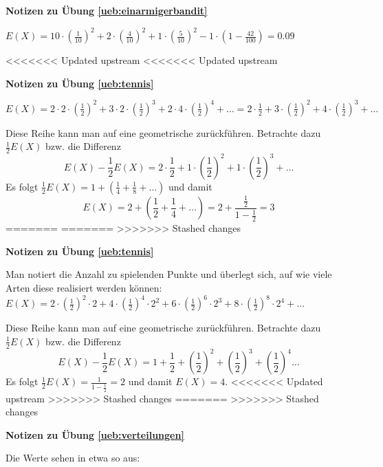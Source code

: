 \documentclass[%
<<<<<<< Updated upstream
<<<<<<< Updated upstream
11pt,%
twoside,%
titlepage,%
german,%
=======
=======
>>>>>>> Stashed changes
11pt,%
twoside,%
titlepage,%
swissgerman,%
<<<<<<< Updated upstream
>>>>>>> Stashed changes
=======
>>>>>>> Stashed changes
headsepline%
]{scrartcl}
\newcommand{\faReturnGray}{\textcolor{gray}{\faMailReply}} %
\theoremstyle{definition}
\theoremstyle{plain}
\newcommand{\concatueb}[1]{ueb:#1}%
\newcommand{\concatlsg}[1]{lsg:#1}%
\newenvironment{lsg}[1]{%
    \par\noindent\textbf{Notizen zu Übung \ref{\concatueb{#1}}}\label{\concatlsg{#1}}
    \hfill\hyperref[\concatueb{#1}]{\faReturnGray}\par %
}{%
    \par%
}
\newcommand{\concatueb}[1]{ueb:#1}%
\newcommand{\concatlsg}[1]{lsg:#1}%
\newenvironment{lsg}[1]{%
    \par\noindent\textbf{Notizen zu Übung \ref{\concatueb{#1}}.}%
    \label{\concatlsg{#1}}
}{%
    \par%
}
\begin{document}
\begin{lsg}{einarmigerbandit}
    $E(X)=10\cdot(\frac{1}{10})^2+2\cdot(\frac{4}{10})^2+1\cdot(\frac{5}{10})^2-1\cdot(1-\frac{42}{100})=0.09$
\end{lsg}
<<<<<<< Updated upstream
<<<<<<< Updated upstream
\begin{lsg}{tennis}
    $E(X)=2\cdot2\cdot(\frac{1}{2})^2+3\cdot2\cdot(\frac{1}{2})^3+2\cdot4\cdot(\frac{1}{2})^4+\dots=2\cdot\frac{1}{2}+3\cdot(\frac{1}{2})^2+4\cdot(\frac{1}{2})^3+\dots$

    Diese Reihe kann man auf eine geometrische zurückführen. Betrachte dazu $\frac{1}{2}E(X)$ bzw. die Differenz
    $$E(X)-\frac{1}{2}E(X)=2\cdot\frac{1}{2}+1\cdot(\frac{1}{2})^2+1\cdot(\frac{1}{2})^3+\dots$$
    Es folgt $\frac{1}{2}E(X)=1+(\frac{1}{4}+\frac{1}{8}+\dots)$ und damit
    $$E(X)=2+(\frac{1}{2}+\frac{1}{4}+\dots)=2+\frac{\frac{1}{2}}{1-\frac{1}{2}}=3$$
=======
=======
>>>>>>> Stashed changes

\begin{lsg}{tennis}
    Man notiert die Anzahl zu spielenden Punkte und überlegt sich, auf wie viele Arten diese realisiert werden können: $E(X)=2\cdot(\frac{1}{2})^2\cdot2+4\cdot(\frac{1}{2})^4\cdot2^2+6\cdot(\frac{1}{2})^6\cdot2^3+8\cdot(\frac{1}{2})^8\cdot 2^4+\dots$

    Diese Reihe kann man auf eine geometrische zurückführen. Betrachte dazu $\frac{1}{2}E(X)$ bzw. die Differenz
    $$E(X)-\frac{1}{2}E(X)=1+\frac{1}{2}+\left(\frac{1}{2}\right)^2+\left(\frac{1}{2}\right)^3+\left(\frac{1}{2}\right)^4\dots$$
    Es folgt $\frac{1}{2}E(X)=\frac{1}{1-\frac{1}{2}}=2$ und damit $E(X)=4$.
<<<<<<< Updated upstream
>>>>>>> Stashed changes
=======
>>>>>>> Stashed changes
\end{lsg}
\begin{lsg}{verteilungen}
    Die Werte sehen in etwa so aus:

\begin{center}
\end{center}
\end{lsg}
\end{lsg}
\end{document}
